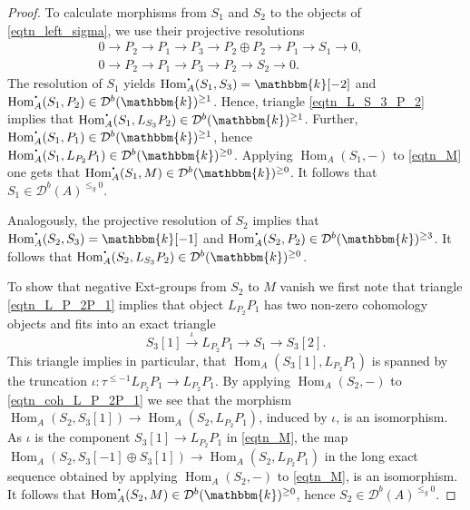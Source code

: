 \documentclass[12pt,a4paper]{amsart}
\newcommand{\dD}{{\mathcal{D}}}
\newcommand{\kk}{\mathbbm{k}}
\newcommand{\tr}{{\mbox{$t$-struc}\-tu\-r}}
\newcommand{\bcdot}{{\mbox{\boldmath{$\cdot$}}}}
\newcommand{\Hom}{\mathop{\textrm{Hom}}\nolimits}
\theoremstyle{definition}
\begin{document}
\begin{proof}
To calculate morphisms from $S_1$ and $S_2$ to the objects of \eqref{eqtn_left_sigma}, we use their projective resolutions
\begin{align*}
	0 \to P_2 \to P_1 \to P_3\to P_2 \oplus P_2 \to P_1 \to S_1 \to 0,&\\
	0 \to P_2 \to P_1 \to P_3 \to P_2 \to S_2 \to 0.&
\end{align*}
 The resolution of $S_1$ yields $\Hom_A^{\bcdot}(S_1, S_3 )=\kk[-2]$ and $\Hom_A^{\bcdot}(S_1, P_2) \in \dD^b(\kk)^{\geq 1}$. Hence, triangle \eqref{eqtn_L_S_3_P_2} implies that $\Hom_A^{\bcdot}(S_1, L_{S_3}P_2) \in \dD^b(\kk)^{\geq 1}$. Further, $\Hom_{A}^{\bcdot}(S_1, P_1)\in \dD^b(\kk)^{\geq 1}$, hence $\Hom_A^{\bcdot}(S_1, L_{P_2}P_1) \in \dD^b(\kk)^{\geq 0}$. Applying $\Hom_A(S_1,-)$ to \eqref{eqtn_M} one gets that $\Hom_A^{\bcdot}(S_1,M) \in \dD^b(\kk)^{\geq 0}$. It follows that $S_1\in \dD^b(A)^{\leq_g 0}$.
 
 Analogously, the projective resolution of $S_2$ implies that $\Hom_A^{\bcdot}(S_2,S_3) = \kk[-1]$ and $\Hom_A^{\bcdot}(S_2,P_2) \in \dD^b(\kk)^{\geq 3}$. It follows that $\Hom_A^{\bcdot}(S_2, L_{S_3}P_2) \in \dD^b(\kk)^{\geq 0}$.
 
 To show that negative Ext-groups from $S_2$ to $M$ vanish we first note that triangle \eqref{eqtn_L_P_2P_1} implies that object $L_{P_2}P_1$ has two non-zero cohomology objects and fits into an exact triangle
 \begin{equation}\label{eqtn_coh_L_P_2P_1}
 	S_3[1] \xrightarrow{\iota} L_{P_2}P_1 \to S_1 \to S_3[2].
 \end{equation}
This triangle implies in particular, that $\Hom_A(S_3[1], L_{P_2}P_1)$ is spanned by the truncation $\iota \colon \tau^{\leq -1}L_{P_2}P_1\to L_{P_2}P_1$. By applying $\Hom_A(S_2, -)$ to \eqref{eqtn_coh_L_P_2P_1} we see that the morphism $\Hom_A(S_2, S_3[1]) \to \Hom_A(S_2, L_{P_2}P_1)$, induced by $\iota$, is an isomorphism. As $\iota$ is the component $S_3[1] \to L_{P_2}P_1$ in \eqref{eqtn_M}, the map $\Hom_A(S_2, S_3[-1] \oplus S_3[1]) \to \Hom_A(S_2, L_{P_2}P_1)$ in the long exact sequence obtained by applying $\Hom_A(S_2, -)$ to \eqref{eqtn_M}, is an isomorphism. It follows that $\Hom_A^{\bcdot}(S_2, M) \in \dD^b(\kk) ^{\geq 0}$, hence $S_2 \in \dD^b(A)^{\leq_g 0}$. 
\end{proof}
%	
\end{document}
